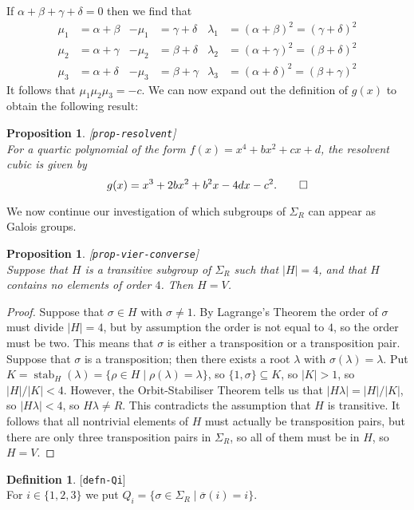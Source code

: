 \documentclass{amsart}
\newcommand{\lbl}[1]{\label{#1}\textup{[\texttt{#1}]}\ \\}
\newcommand{\lbl}{\label}
\newcommand{\stab}	{\operatorname{stab}}
\newcommand{\al}        {\alpha}
\newcommand{\bt}        {\beta}
\newcommand{\gm}        {\gamma}
\newcommand{\dl}        {\delta}
\newcommand{\lm}        {\lambda}
\newcommand{\sg}        {\sigma}
\newcommand{\Sg}        {\Sigma}
\newcommand{\ov}[1]     {\overline{#1}}
\newcommand{\st}        {\;|\;}
\newcommand{\sse}       {\subseteq}
\renewcommand{\:}{\colon}
\newtheorem{proposition}[theorem]{Proposition}
\theoremstyle{definition}
\newtheorem{definition}[theorem]{Definition}
\begin{document}
If $\al+\bt+\gm+\dl=0$ then we find that 
\begin{align*}
 \mu_1 &= \al+\bt & -\mu_1 &= \gm+\dl & 
  \lm_1 &= (\al+\bt)^2=(\gm+\dl)^2 \\
 \mu_2 &= \al+\gm & -\mu_2 &= \bt+\dl & 
  \lm_2 &= (\al+\gm)^2=(\bt+\dl)^2 \\
 \mu_3 &= \al+\dl & -\mu_3 &= \bt+\gm & 
  \lm_3 &= (\al+\dl)^2=(\bt+\gm)^2 
\end{align*}
It follows that $\mu_1\mu_2\mu_3=-c$.  We can now expand out the
definition of $g(x)$ to obtain the following result:

\begin{proposition}\lbl{prop-resolvent}
 For a quartic polynomial of the form $f(x)=x^4+bx^2+cx+d$, the
 resolvent cubic is given by 
 \[ g(x) = x^3+2bx^2+b^2x-4dx-c^2. \qed \]
\end{proposition}

We now continue our investigation of which subgroups of $\Sg_R$ can
appear as Galois groups.

\begin{proposition}\lbl{prop-vier-converse}
 Suppose that $H$ is a transitive subgroup of $\Sg_R$ such that
 $|H|=4$, and that $H$ contains no elements of order $4$.  Then
 $H=V$. 
\end{proposition}
\begin{proof}
 Suppose that $\sg\in H$ with $\sg\neq 1$.  By Lagrange's Theorem the
 order of $\sg$ must divide $|H|=4$, but by assumption the order is
 not equal to $4$, so the order must be two.  This means that $\sg$ is
 either a transposition or a transposition pair.  Suppose that $\sg$
 is a transposition; then there exists a root $\lm$ with
 $\sg(\lm)=\lm$.  Put $K=\stab_H(\lm)=\{\rho\in H\st\rho(\lm)=\lm\}$,
 so $\{1,\sg\}\sse K$, so $|K|>1$, so $|H|/|K|<4$.  However, the
 Orbit-Stabiliser Theorem tells us that $|H\lm|=|H|/|K|$, so
 $|H\lm|<4$, so $H\lm\neq R$.  This contradicts the assumption that
 $H$ is transitive.  It follows that all nontrivial elements of $H$
 must actually be transposition pairs, but there are only three
 transposition pairs in $\Sg_R$, so all of them must be in $H$, so
 $H=V$.
\end{proof}

\begin{definition}\lbl{defn-Qi}
 For $i\in\{1,2,3\}$ we put $Q_i=\{\sg\in\Sg_R\st\ov{\sg}(i)=i\}$.  
\end{definition}
\end{document}
